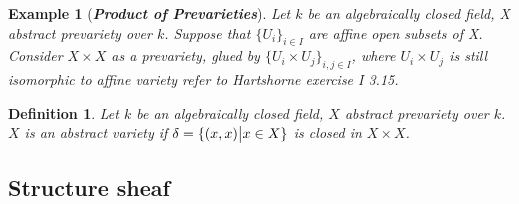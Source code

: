 \documentclass{ctexart}
\newtheorem{definition}{Definition}[section]
\newtheorem{example}{Example}[section]
\begin{document}
\begin{example}[\textbf{\emph{Product of Prevarieties}}]
    Let $k$ be an algebraically closed field, X abstract prevariety over $k$.
    Suppose that $\{U_{i}\}_{i\in I}$ are affine open subsets of X.
    Consider $X \times X$ as a prevariety, glued by $\{U_{i} \times U_{j}\}_{i,j\in I}$,
    where $U_{i} \times U_{j}$ is still isomorphic to affine variety refer to Hartshorne exercise I 3.15.
\end{example}
\begin{definition}
    Let $k$ be an algebraically closed field, $X$ abstract prevariety over $k$.
    $X$ is an abstract variety if $\delta = \{(x, x) \big{|} x\in X\}$ is closed in $X \times X$. 
\end{definition}

\subsection{Structure sheaf}
\label{subsection:Schemes_Structure_sheaf}
\end{document}
